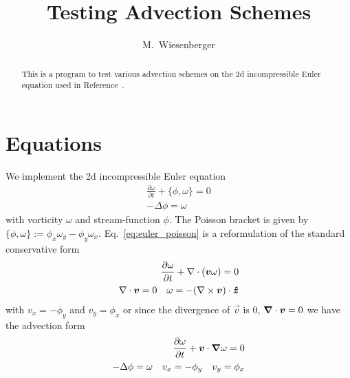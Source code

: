 


\usepackage{minted}



\title{Testing Advection Schemes}
\author{ M.~Wiesenberger}
\maketitle

\begin{abstract}
  This is a program to test various advection schemes on the 2d incompressible Euler
  equation used in Reference~\cite{Einkemmer2014}.
\end{abstract}

\section{Equations}
We implement the 2d incompressible Euler equation
\begin{subequations}
\begin{align}
 \frac{\partial \omega}{\partial t} + \{ \phi, \omega\} = 0 \\
 -\Delta \phi = \omega \label{eq:euler_poisson_elliptic}
\end{align}
\label{eq:euler_poisson}
\end{subequations}
with vorticity $\omega$ and stream-function $\phi$.
The Poisson bracket is given by $\{ \phi, \omega\} := \phi_x \omega_y - \phi_y \omega_x$.
Eq.~\eqref{eq:euler_poisson} is a reformulation of the standard conservative form
\begin{subequations}
\begin{align}
    \frac{\partial \omega}{\partial t} + \nabla\cdot({{\boldsymbol{v}} \omega}) = 0 \\
\nabla\cdot{\boldsymbol{v}} = 0 \quad \omega = -(\nabla\times {\boldsymbol{v}})\cdot \bm{\hat{z}}
\end{align}
\label{eq:euler_conservative}
\end{subequations}
with $v_x = - \phi_y$ and $v_y = \phi_x$
or since the divergence of $\vec v$ is $0$, ${\boldsymbol{\nabla}}\cdot {\boldsymbol{v}} = 0$ we have the advection form
\begin{subequations}
\begin{align}
    \frac{\partial \omega}{\partial t} + {\boldsymbol{v}}\cdot{\boldsymbol{\nabla}} \omega = 0 \\
    -\Delta\phi = \omega \quad v_x = -\phi_y \quad v_y = \phi_x
\end{align}
\label{eq:euler_advection}
\end{subequations}

